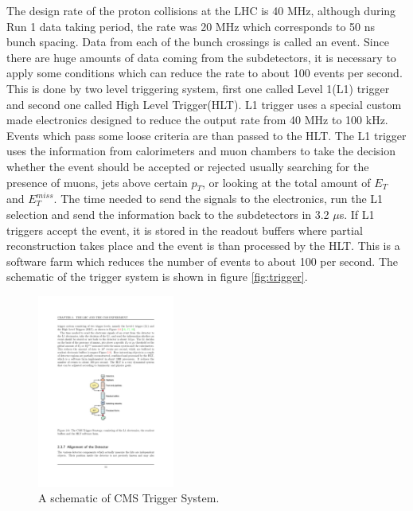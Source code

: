 The design rate of the proton collisions at the LHC is 40 MHz, although during Run 1 data taking period, the rate was 20 MHz which corresponds to 50 ns bunch spacing. Data from each of the bunch crossings is called an event. Since there are huge amounts of data coming from the subdetectors, it is necessary to apply some conditions which can reduce the rate to about 100 events per second. This is done by two level triggering system, first one called Level 1(L1) trigger and second one called High Level Trigger(HLT). L1 trigger uses a special custom made electronics designed to reduce the output rate from 40 MHz to 100 kHz. Events which pass some loose criteria are than passed to the HLT. The L1 trigger uses the information from calorimeters and muon chambers to take the decision whether the event should be accepted or rejected usually searching for the presence of muons, jets above certain $p_T$, or looking at the total amount of $E_T$ and $E_T^{miss}$. The time needed to send the signals to the electronics, run the L1 selection and send the information back to the subdetectors in 3.2 $\mu$s. If L1 triggers accept the event, it is stored in the readout buffers where partial reconstruction takes place and the event is than processed by the HLT. This is a software farm which reduces the number of events to about 100 per second. The schematic of the trigger system is shown in figure \ref{fig:trigger}.
\begin{figure}[htbp]
	\centering
		\includegraphics[width=0.4\textwidth]{Figures/trigger.pdf}
	\caption[A drawing of CMS Trigger System.]{A schematic of CMS Trigger System. \cite{Chatrchyan:2008aa}}
	\label{fig:trig}
\end{figure}


